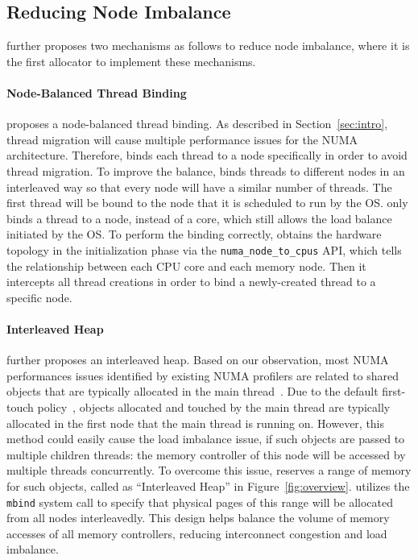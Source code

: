 \subsection{Reducing Node Imbalance}
\label{sec:balance}

\NM{} further proposes two mechanisms as follows to reduce node imbalance, where it is the first allocator to implement these mechanisms. 

\paragraph{Node-Balanced Thread Binding} \NM{} proposes a node-balanced thread binding. As described in Section~\ref{sec:intro}, thread migration will cause multiple performance issues for the NUMA architecture. Therefore, \NM{} binds each thread to a node specifically in order to avoid thread migration. To improve the balance, \NM{} binds threads to different nodes in an interleaved way so that every node will have a similar number of threads. The first thread will be bound to the node that it is scheduled to run by the OS. \NM{} only binds a thread to a node, instead of a core, which still allows the load balance initiated by the OS. To perform the binding correctly, \NM{} obtains the hardware topology in the initialization phase via the \texttt{numa\_node\_to\_cpus} API, which tells the relationship between each CPU core and each memory node. Then it intercepts all thread creations in order to bind a newly-created thread to a specific node. 

\paragraph{Interleaved Heap} \NA{} further proposes an interleaved heap. Based on our observation, most NUMA performances issues identified by existing NUMA profilers are related to shared objects that are typically allocated in the main thread~\cite{XULIU, MemProf}. Due to the default first-touch policy~\cite{lameter2013numa, diener2015locality}, objects allocated and touched by the main thread are typically allocated in the first node that the main thread is running on. However, this method could easily cause the load imbalance issue, if such objects are passed to multiple children threads: the memory controller of this node will be accessed by multiple threads concurrently. To overcome this issue, \NA{} reserves a range of memory for such objects, called as ``Interleaved Heap'' in Figure~\ref{fig:overview}. \NA{} utilizes the \texttt{mbind} system call to specify that physical pages of this range will be allocated from all nodes interleavedly. This design helps balance the volume of memory accesses of all memory controllers, reducing interconnect congestion and load imbalance. 

